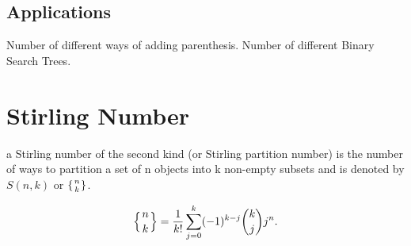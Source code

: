 \subsection{Applications}
Number of different ways of adding parenthesis. 
Number of different Binary Search Trees.


\section{Stirling Number}
a Stirling number of the second kind (or Stirling partition number) is the number of ways to partition a set of n objects into k non-empty subsets and is denoted by $S(n,k)$ or  $\lbrace{n\atop k}\rbrace$.

$$
\left\{ {n \atop k}\right\} = \frac{1}{k!}\sum_{j=0}^{k} (-1)^{k-j} \binom{k}{j} j^n.
$$
